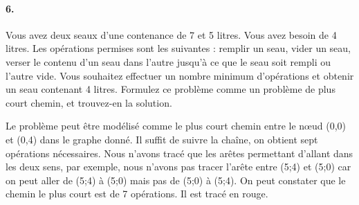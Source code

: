 \paragraph{6. } Vous avez deux seaux d'une contenance de 7 et 5 litres. Vous avez besoin de 4 litres. Les opérations permises sont les suivantes : remplir un seau, vider un seau, verser le contenu d'un seau dans l'autre jusqu'à ce que le seau soit rempli ou l'autre vide. Vous souhaitez effectuer un nombre minimum d'opérations et obtenir un seau contenant 4 litres. Formulez ce problème comme un problème de plus court chemin, et trouvez-en la solution.

\begin{solution}
Le problème peut être modélisé comme le plus court chemin entre le nœud (0,0) et (0,4) dans le graphe donné. Il suffit de suivre la chaîne, on obtient sept opérations nécessaires. Nous n'avons tracé que les arêtes permettant d'allant dans les deux sens, par exemple, nous n'avons pas tracer  l'arête entre (5;4) et (5;0) car on peut aller de (5;4) à (5;0) mais pas de (5;0) à (5;4). On peut constater que le chemin le plus court est de 7 opérations. Il est tracé en rouge.
\begin{figure}[h!]
\centering
{}
\end{figure}
\end{solution}


